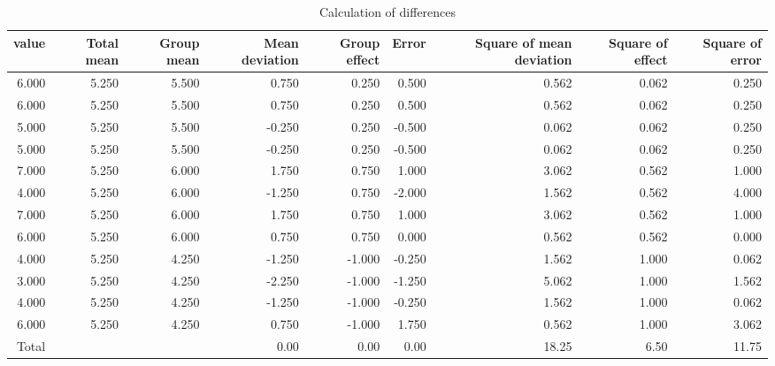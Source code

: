 \begin{table}[ht]
	\centering
	\caption{Calculation of differences}
	\begin{tabular}{rrrrrrrrr}
		\hline
		value & Total mean & Group mean & Mean deviation & Group effect & Error  & Square of mean deviation & Square of effect & Square of error \\
		\hline
		6.000 & 5.250      & 5.500      & 0.750          & 0.250        & 0.500  & 0.562                    & 0.062            & 0.250           \\
		6.000 & 5.250      & 5.500      & 0.750          & 0.250        & 0.500  & 0.562                    & 0.062            & 0.250           \\
		5.000 & 5.250      & 5.500      & -0.250         & 0.250        & -0.500 & 0.062                    & 0.062            & 0.250           \\
		5.000 & 5.250      & 5.500      & -0.250         & 0.250        & -0.500 & 0.062                    & 0.062            & 0.250           \\
		7.000 & 5.250      & 6.000      & 1.750          & 0.750        & 1.000  & 3.062                    & 0.562            & 1.000           \\
		4.000 & 5.250      & 6.000      & -1.250         & 0.750        & -2.000 & 1.562                    & 0.562            & 4.000           \\
		7.000 & 5.250      & 6.000      & 1.750          & 0.750        & 1.000  & 3.062                    & 0.562            & 1.000           \\
		6.000 & 5.250      & 6.000      & 0.750          & 0.750        & 0.000  & 0.562                    & 0.562            & 0.000           \\
		4.000 & 5.250      & 4.250      & -1.250         & -1.000       & -0.250 & 1.562                    & 1.000            & 0.062           \\
		3.000 & 5.250      & 4.250      & -2.250         & -1.000       & -1.250 & 5.062                    & 1.000            & 1.562           \\
		4.000 & 5.250      & 4.250      & -1.250         & -1.000       & -0.250 & 1.562                    & 1.000            & 0.062           \\
		6.000 & 5.250      & 4.250      & 0.750          & -1.000       & 1.750  & 0.562                    & 1.000            & 3.062           \\
		\hline\hline
		Total &            &            & 0.00           & 0.00         & 0.00   & 18.25                    & 6.50             & 11.75           \\\hline
	\end{tabular}
	\label{tbl::21_04}
\end{table}
